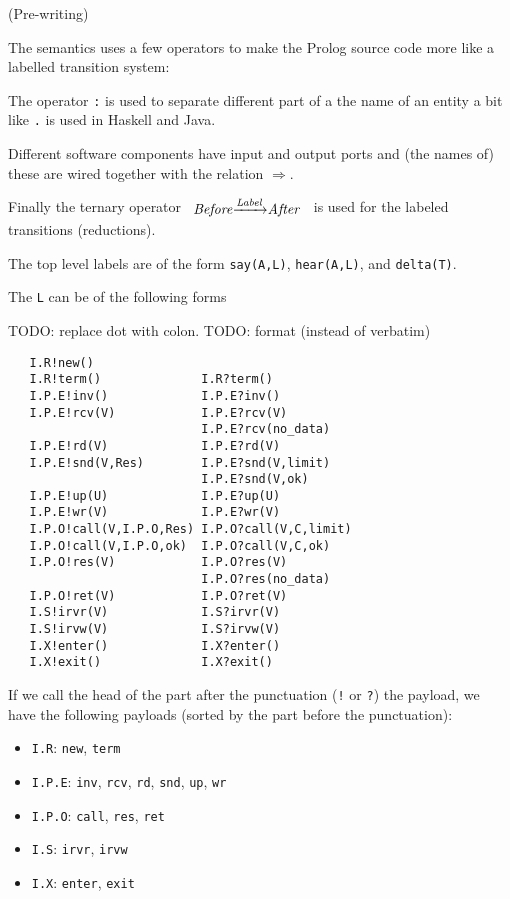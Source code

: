 \newcommand{\Preduce}[3]{\ensuremath{#1 &\xrightarrow{#2}& #3}}
\newcommand{\Pignore}[1]{\ensuremath{\mathit{ignore}#1}}
\newcommand{\Pif}{\ensuremath{\mathbin{:\!\!-}}}

(Pre-writing)

The semantics uses a few operators to make the Prolog source code more
like a labelled transition system:

The operator \verb+:+ is used to separate different part of a the name of
an entity a bit like \verb+.+ is used in Haskell and Java.

Different software components have input and output ports and (the
names of) these are wired together with the relation
\ensuremath{\Rightarrow{}}.

Finally the ternary operator \(\begin{array}{r@{}c@{}l}\Preduce{\mathit{Before}}{\mathit{Label}}{\mathit{After}}\end{array}\) is
used for the labeled transitions (reductions).

The top level labels are of the form \verb+say(A,L)+,
\verb+hear(A,L)+, and \verb+delta(T)+.

The \verb+L+ can be of the following forms

TODO: replace dot with colon.
TODO: format (instead of verbatim)

\begin{verbatim}
   I.R!new()
   I.R!term()              I.R?term()
   I.P.E!inv()             I.P.E?inv()
   I.P.E!rcv(V)            I.P.E?rcv(V)
                           I.P.E?rcv(no_data)
   I.P.E!rd(V)             I.P.E?rd(V)
   I.P.E!snd(V,Res)        I.P.E?snd(V,limit)
                           I.P.E?snd(V,ok)
   I.P.E!up(U)             I.P.E?up(U)
   I.P.E!wr(V)             I.P.E?wr(V)
   I.P.O!call(V,I.P.O,Res) I.P.O?call(V,C,limit)
   I.P.O!call(V,I.P.O,ok)  I.P.O?call(V,C,ok)
   I.P.O!res(V)            I.P.O?res(V)
                           I.P.O?res(no_data)
   I.P.O!ret(V)            I.P.O?ret(V)
   I.S!irvr(V)             I.S?irvr(V)
   I.S!irvw(V)             I.S?irvw(V)
   I.X!enter()             I.X?enter()
   I.X!exit()              I.X?exit()
\end{verbatim}

If we call the head of the part after the punctuation (\verb+!+ or
\verb+?+) the payload, we have the following payloads (sorted by the
part before the punctuation):

\begin{itemize}
\item \verb+I.R+:   \verb+new+, \verb+term+
\item \verb+I.P.E+: \verb+inv+, \verb+rcv+, \verb+rd+, \verb+snd+, \verb+up+, \verb+wr+
\item \verb+I.P.O+: \verb+call+, \verb+res+, \verb+ret+
\item \verb+I.S+:   \verb+irvr+, \verb+irvw+
\item \verb+I.X+:   \verb+enter+, \verb+exit+
\end{itemize}

